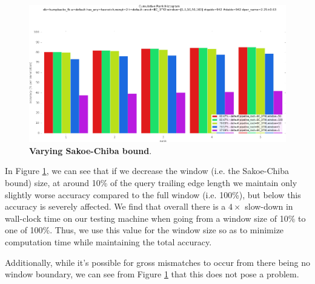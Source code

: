 



\begin{figure}[t]%
\centering
\includegraphics[width=1\textwidth]{../images/results/vary_window.png}
\caption{\textbf{Varying Sakoe-Chiba bound}.}
\label{fig:vary_window}
\end{figure}



In Figure \ref{fig:vary_window}, we can see that if we decrease the window (i.e. the Sakoe-Chiba bound) size, at around 10\% of the query trailing edge length we maintain only slightly worse accuracy compared to the full window (i.e. 100\%), but below this accuracy is severely affected.
We find that overall there is a $4\times$ slow-down in wall-clock time on our testing machine when going from a window size of 10\% to one of 100\%. 
Thus, we use this value for the window size so as to minimize computation time while maintaining the total accuracy.

Additionally, while it's possible for gross mismatches to occur from there being no window boundary, we can see from Figure \ref{fig:vary_window} that this does not pose a problem.

